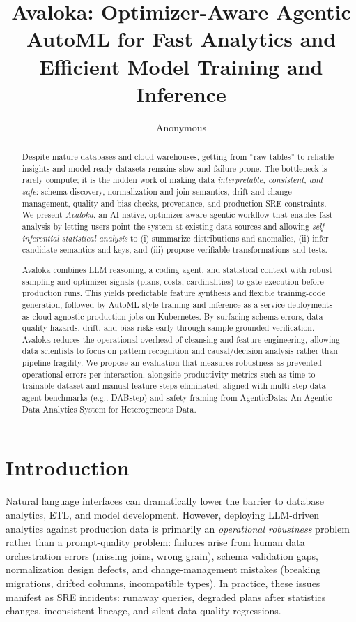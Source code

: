 \documentclass{article} %
\title{Avaloka: Optimizer-Aware Agentic AutoML for Fast Analytics and Efficient Model Training and Inference}
\author{Anonymous}
\begin{document}
\maketitle

\begin{abstract}
Despite mature databases and cloud warehouses, getting from ``raw tables'' to reliable insights and
model-ready datasets remains slow and failure-prone. The bottleneck is rarely compute; it is the
hidden work of making data \emph{interpretable, consistent, and safe}: schema discovery, normalization
and join semantics, drift and change management, quality and bias checks, provenance, and production
SRE constraints. We present \emph{Avaloka}, an AI-native, optimizer-aware agentic workflow that enables
fast analysis by letting users point the system at existing data sources and allowing
\emph{self-inferential statistical analysis} to (i) summarize distributions and anomalies, (ii) infer
candidate semantics and keys, and (iii) propose verifiable transformations and tests.

Avaloka combines LLM reasoning, a coding agent, and statistical context with robust sampling and
optimizer signals (plans, costs, cardinalities) to gate execution before production runs. This yields
predictable feature synthesis and flexible training-code generation, followed by AutoML-style training
and inference-as-a-service deployments as cloud-agnostic production jobs on Kubernetes. By surfacing
schema errors, data quality hazards, drift, and bias risks early through sample-grounded verification,
Avaloka reduces the operational overhead of cleansing and feature engineering, allowing data scientists
to focus on pattern recognition and causal/decision analysis rather than pipeline fragility. We propose
an evaluation that measures robustness as prevented operational errors per interaction, alongside
productivity metrics such as time-to-trainable dataset and manual feature steps eliminated, aligned
with multi-step data-agent benchmarks (e.g., DABstep) and safety framing from AgenticData: An Agentic Data Analytics System for Heterogeneous Data.
\end{abstract}

\section{Introduction}
Natural language interfaces can dramatically lower the barrier to database analytics, ETL, and model
development. However, deploying LLM-driven analytics against production data is primarily an
\emph{operational robustness} problem rather than a prompt-quality problem: failures arise from
human data orchestration errors (missing joins, wrong grain), schema validation gaps, normalization
design defects, and change-management mistakes (breaking migrations, drifted columns, incompatible
types). In practice, these issues manifest as SRE incidents: runaway queries, degraded plans after
statistics changes, inconsistent lineage, and silent data quality regressions.
\end{document}
